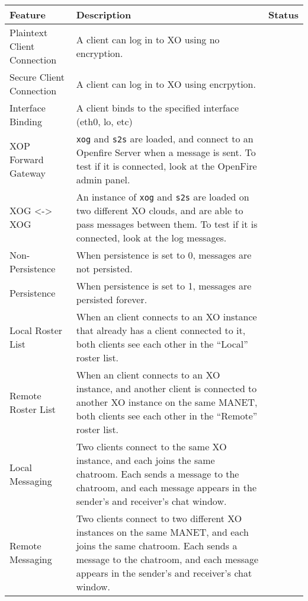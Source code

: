 \documentclass{article}
\begin{document}
\noindent \begin{tabular}{|p{3cm}|p{7.25cm}|r|} \hline
\textbf{Feature} & \textbf{Description} & \textbf{Status} \\ \hline

Plaintext Client Connection & A client can log in to XO using no encryption. &
    \\ \hline

Secure Client Connection & A client can log in to XO using encrpytion. & \\
    \hline

Interface Binding & A client binds to the specified interface (eth0, lo, etc)
    & \\ \hline

XOP Forward Gateway & \texttt{xog} and \texttt{s2s} are loaded, and connect to 
    an Openfire Server when a message is sent.  To test if it is connected,
    look at the OpenFire admin panel.& \\ \hline

XOG <-> XOG & An instance of \texttt{xog} and \texttt{s2s} are loaded on two 
    different XO clouds, and are able to pass messages between them. To test if
    it is connected, look at the log messages.& \\ \hline

Non-Persistence & When persistence is set to 0, messages are not persisted. & \\
    \hline

Persistence & When persistence is set to 1, messages are persisted forever. & \\
    \hline

Local Roster List & When an client connects to an XO instance that already has
    a client connected to it, both clients see each other in the ``Local'' roster
    list. & \\ \hline

Remote Roster List & When an client connects to an XO instance, and another
    client is connected to another XO instance on the same MANET, both clients 
    see each other in the ``Remote'' roster list. & \\ \hline

Local Messaging & Two clients connect to the same XO instance, and each joins
    the same chatroom.  Each sends a message to the chatroom, and each message 
    appears in the sender's and receiver's chat window. & \\ \hline

Remote Messaging & Two clients connect to two different XO instances on the
    same MANET, and each joins the same chatroom.  Each sends a message to the
    chatroom, and each message appears in the sender's and receiver's chat 
    window. & \\ \hline


\end{tabular}
\end{document}
